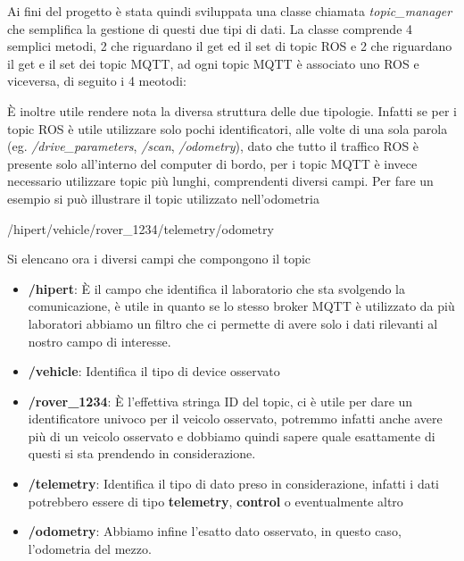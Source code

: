 \noindent Ai fini del progetto è stata quindi sviluppata una classe chiamata \textit{topic\_manager} che semplifica la gestione di questi due tipi di dati. La classe comprende 4 semplici metodi, 2 che riguardano il get ed il set di topic ROS e 2 che riguardano il get e il set dei topic MQTT, ad ogni topic MQTT è associato uno ROS e viceversa, di seguito i 4 meotodi:



\noindent È inoltre utile rendere nota la diversa struttura delle due tipologie. Infatti se per i topic ROS è utile utilizzare solo pochi identificatori, alle volte di una sola parola (eg. \textit{/drive\_parameters}, \textit{/scan}, \textit{/odometry}), dato che tutto il traffico ROS è presente solo all'interno del computer di bordo, per i topic MQTT è invece necessario utilizzare topic più lunghi, comprendenti diversi campi. 
\noindent Per fare un esempio si può illustrare il topic utilizzato nell'odometria
\begin{center}
  /hipert/vehicle/rover\_1234/telemetry/odometry
\end{center}

\noindent Si elencano ora i diversi campi che compongono il topic

\begin{itemize}
  \item \textbf{/hipert}: È il campo che identifica il laboratorio che sta svolgendo la comunicazione, è utile in quanto se lo stesso broker MQTT è utilizzato da più laboratori abbiamo un filtro che ci permette di avere solo i dati rilevanti al nostro campo di interesse.
  \item \textbf{/vehicle}: Identifica il tipo di device osservato
  \item \textbf{/rover\_1234}: È l'effettiva stringa ID del topic, ci è utile per dare un identificatore univoco per il veicolo osservato, potremmo infatti anche avere più di un veicolo osservato e dobbiamo quindi sapere quale esattamente di questi si sta prendendo in considerazione.
  \item \textbf{/telemetry}: Identifica il tipo di dato preso in considerazione, infatti i dati potrebbero essere di tipo \textbf{telemetry}, \textbf{control} o eventualmente altro
  \item \textbf{/odometry}: Abbiamo infine l'esatto dato osservato, in questo caso, l'odometria del mezzo.
\end{itemize}
